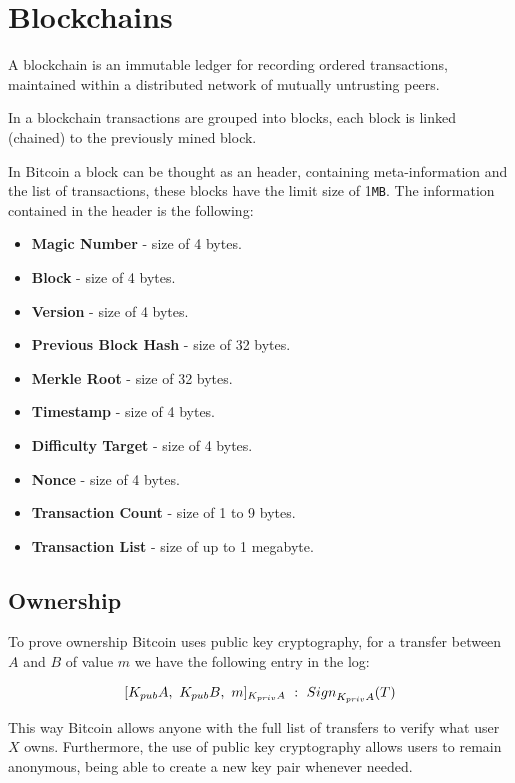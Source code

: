 \section{Blockchains}

A blockchain is an immutable ledger for recording ordered transactions,
maintained within a distributed network of mutually untrusting peers.

In a blockchain transactions are grouped into blocks,
each block is linked (chained) to the previously mined block.

In Bitcoin a block can be thought as an header, containing meta-information and the list of transactions,
these blocks have the limit size of 1\texttt{MB}.
The information contained in the header is the following:
\begin{itemize}
    \item \textbf{Magic Number} - size of 4 bytes.
    \item \textbf{Block} - size of 4 bytes.
    \item \textbf{Version} - size of 4 bytes.
    \item \textbf{Previous Block Hash} - size of 32 bytes.
    \item \textbf{Merkle Root} - size of 32 bytes.
    \item \textbf{Timestamp} - size of 4 bytes.
    \item \textbf{Difficulty Target} - size of 4 bytes.
    \item \textbf{Nonce} - size of 4 bytes.
    \item \textbf{Transaction Count} - size of 1 to 9 bytes.
    \item \textbf{Transaction List} - size of up to 1 megabyte.
\end{itemize}

\subsection{Ownership}

To prove ownership Bitcoin uses public key cryptography,
for a transfer between $A$ and $B$ of value $m$ we have the following entry in the log:

$$
[K_{pub}A,~K_{pub}B,~m]_{K_{priv}A}~:~\mathnormal{Sign}_{K_{priv}A}(T)
$$

This way Bitcoin allows anyone with the full list of transfers to verify what user $X$ owns.
Furthermore, the use of public key cryptography allows users to remain anonymous,
being able to create a new key pair whenever needed.

